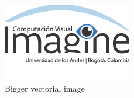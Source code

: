 \documentclass[10pt,twocolumn,letterpaper]{article}
\begin{document}
\begin{figure}
\begin{center}
\includegraphics[width=0.8\linewidth]{imagine.png}
\end{center}
   \caption{Bigger vectorial image}
\label{fig:short}
\end{figure}
\end{document}
